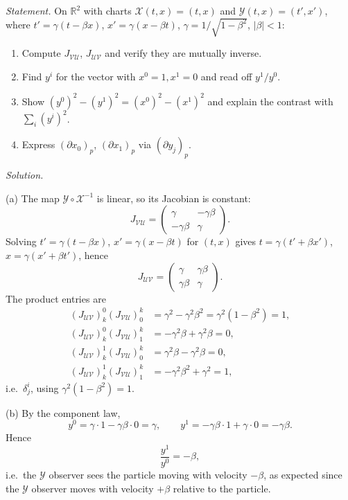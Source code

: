 \documentclass[11pt]{article}
\begin{document}
\noindent\textit{Statement.} On $\mathbb R^2$ with charts $\mathcal
X(t,x)=(t,x)$ and $\mathcal Y(t,x)=(t',x')$, where $t'=\gamma(t-\beta x)$,
$x'=\gamma(x-\beta t)$, $\gamma=1/\sqrt{1-\beta^2}$, $|\beta|<1$:
\begin{enumerate}[label=(\alph*)]
  \item Compute $J_{\mathcal{VU}}$, $J_{\mathcal{UV}}$ and verify they are
  mutually inverse.
  \item Find $y^i$ for the vector with $x^0=1,x^1=0$ and read off
  $y^1/y^0$.
  \item Show $(y^0)^2-(y^1)^2=(x^0)^2-(x^1)^2$ and explain the contrast
  with $\sum_i(y^i)^2$.
  \item Express $(\partial x_0)_p$, $(\partial x_1)_p$ via $(\partial y_j)_p$.
\end{enumerate}

\medskip
\noindent\textit{Solution.}

(a) The map $\mathcal Y\circ\mathcal X^{-1}$ is linear, so its Jacobian is
constant:
\[
J_{\mathcal{VU}}=\begin{pmatrix}\gamma&-\gamma\beta\\-\gamma\beta&\gamma\end{pmatrix}.
\]
Solving $t'=\gamma(t-\beta x)$, $x'=\gamma(x-\beta t)$ for $(t,x)$ gives
$t=\gamma(t'+\beta x')$, $x=\gamma(x'+\beta t')$, hence
\[
J_{\mathcal{UV}}=\begin{pmatrix}\gamma&\gamma\beta\\\gamma\beta&\gamma\end{pmatrix}.
\]
The product entries are
\begin{align*}
(J_{\mathcal{UV}})^0_k(J_{\mathcal{VU}})^k_0&=\gamma^2-\gamma^2\beta^2=
\gamma^2(1-\beta^2)=1,\\
(J_{\mathcal{UV}})^0_k(J_{\mathcal{VU}})^k_1&=-\gamma^2\beta+\gamma^2\beta=0,\\
(J_{\mathcal{UV}})^1_k(J_{\mathcal{VU}})^k_0&=\gamma^2\beta-\gamma^2\beta=0,\\
(J_{\mathcal{UV}})^1_k(J_{\mathcal{VU}})^k_1&=-\gamma^2\beta^2+\gamma^2=1,
\end{align*}
i.e.\ $\delta^i_j$, using $\gamma^2(1-\beta^2)=1$.

(b) By the component law,
\[
y^0=\gamma\cdot1-\gamma\beta\cdot0=\gamma,\qquad
y^1=-\gamma\beta\cdot1+\gamma\cdot0=-\gamma\beta.
\]
Hence
\[
\frac{y^1}{y^0}=-\beta,
\]
i.e.\ the $\mathcal Y$ observer sees the particle moving with velocity
$-\beta$, as expected since the $\mathcal Y$ observer moves with velocity
$+\beta$ relative to the particle.
\end{document}
